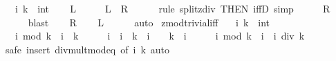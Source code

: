 \begin{isabellebody}
\ \ \ i\ k\ {\isacharcolon}{\kern0pt}{\isacharcolon}{\kern0pt}\ int\isanewline
%
\isadelimproof
%
\endisadelimproof
%
\isatagproof
{}\isamarkupfalse%
\isanewline
\ \ \isamarkupfalse%
\ {\isacharquery}{\kern0pt}L\isanewline
\ \ \isamarkupfalse%
\ \isamarkupfalse%
\ {\isachardoublequoteopen}{\isacharquery}{\kern0pt}L\ {\isasymlongrightarrow}\ {\isacharquery}{\kern0pt}R{\isachardoublequoteclose}\isanewline
\ \ \ \ \isamarkupfalse%
\ {\isacharparenleft}{\kern0pt}rule\ split{\isacharunderscore}{\kern0pt}zdiv\ {\isacharbrackleft}{\kern0pt}THEN\ iffD{}{\isacharbrackright}{\kern0pt}{\isacharparenright}{\kern0pt}\ simp\isanewline
\ \ \isamarkupfalse%
\ \isamarkupfalse%
\ {\isacharquery}{\kern0pt}R\isanewline
\ \ \ \ \isamarkupfalse%
\ blast\isanewline
{}\isamarkupfalse%
\isanewline
\ \ \isamarkupfalse%
\ {\isacharquery}{\kern0pt}R\ \isamarkupfalse%
\ \isamarkupfalse%
\ {\isacharquery}{\kern0pt}L\isanewline
\ \ \ \ \isamarkupfalse%
\ auto\isanewline
{}\isamarkupfalse%
%
\endisatagproof
{\isafoldproof}%
%
\isadelimproof
\isanewline
%
\endisadelimproof
\isanewline
{}\isamarkupfalse%
\ zmod{\isacharunderscore}{\kern0pt}trivial{\isacharunderscore}{\kern0pt}iff{\isacharcolon}{\kern0pt}\isanewline
\ \ \ i\ k\ {\isacharcolon}{\kern0pt}{\isacharcolon}{\kern0pt}\ int\isanewline
\ \ \ {\isachardoublequoteopen}i\ mod\ k\ {\isacharequal}{\kern0pt}\ i\ {\isasymlongleftrightarrow}\ k\ {\isacharequal}{\kern0pt}\ {}\ {\isasymor}\ {}\ {\isasymle}\ i\ {\isasymand}\ i\ {\isacharless}{\kern0pt}\ k\ {\isasymor}\ i\ {\isasymle}\ {}\ {\isasymand}\ k\ {\isacharless}{\kern0pt}\ i{\isachardoublequoteclose}\isanewline
%
\isadelimproof
%
\endisadelimproof
%
\isatagproof
{}\isamarkupfalse%
\ {\isacharminus}{\kern0pt}\isanewline
\ \ \isamarkupfalse%
\ {\isachardoublequoteopen}i\ mod\ k\ {\isacharequal}{\kern0pt}\ i\ {\isasymlongleftrightarrow}\ i\ div\ k\ {\isacharequal}{\kern0pt}\ {}{\isachardoublequoteclose}\isanewline
\ \ \ \ \isamarkupfalse%
\ safe\ {\isacharparenleft}{\kern0pt}insert\ div{\isacharunderscore}{\kern0pt}mult{\isacharunderscore}{\kern0pt}mod{\isacharunderscore}{\kern0pt}eq\ {\isacharbrackleft}{\kern0pt}of\ i\ k{\isacharbrackright}{\kern0pt}{\isacharcomma}{\kern0pt}\ auto{\isacharparenright}{\kern0pt}\isanewline

\end{isabellebody}
